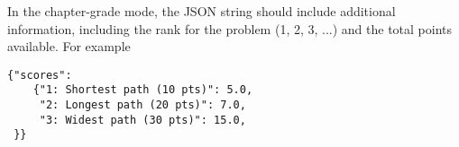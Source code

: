 \begin{gram}
\label{sec:codelabs::chapter::output}
  
In the chapter-grade mode, the JSON string should include additional information, including the rank for the problem (1, 2, 3, ...) and the total points available.  For example

\begin{lstlisting}
{"scores":
    {"1: Shortest path (10 pts)": 5.0,
     "2: Longest path (20 pts)": 7.0,
     "3: Widest path (30 pts)": 15.0,
 }}
\end{lstlisting}
\end{gram}
